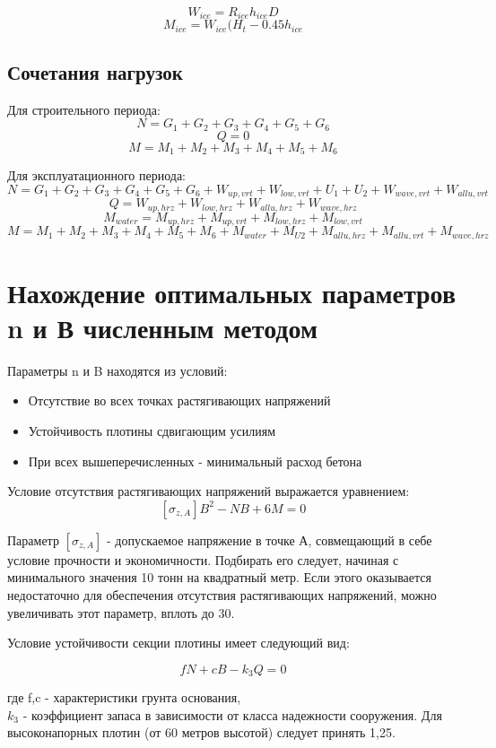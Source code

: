 \documentclass[12pt,a4paper,oneside,draft,titlepage]{article}
\begin{document}
$$ W_{ice} = R_{ice} h_{ice} D $$
$$ M_{ice} = W_{ice} (H_t - 0.45 h_{ice} $$

\subsection{Сочетания нагрузок}

Для строительного периода:
$$ N = G_1 + G_2 + G_3 + G_4 + G_5 + G_6 $$
$$ Q = 0 $$
$$ M = M_1 + M_2 + M_3 + M_4 + M_5 + M_6 $$

Для эксплуатационного периода:
$$ N = G_1 + G_2 + G_3 + G_4 + G_5 + G_6 + W_{up,vrt} + W_{low,vrt} + U_1 + U_2 + W_{wave,vrt} + W_{allu,vrt} $$
$$ Q = W_{up,hrz} + W_{low,hrz} + W_{allu,hrz} + W_{wave,hrz} $$
$$ M_{water} = M_{up,hrz} + M_{up,vrt} + M_{low,hrz} + M_{low,vrt} $$
$$ M = M_1 + M_2 + M_3 + M_4 + M_5 + M_6 + M_{water} + M_{U2} + M_{allu,hrz} + M_{allu,vrt} + M_{wave,hrz} $$

\section{Нахождение оптимальных параметров n и В численным методом}

Параметры n и B находятся из условий:
\begin{itemize}
	\item Отсутствие во всех точках растягивающих напряжений
	\item Устойчивость плотины сдвигающим усилиям
	\item При всех вышеперечисленных - минимальный расход бетона
\end{itemize}

Условие отсутствия растягивающих напряжений выражается уравнением:
$$ [\sigma_{z,A}]  B ^ 2 - N  B + 6  M = 0 $$

Параметр $[\sigma_{z,A}]$ - допускаемое напряжение в точке А, совмещающий в себе условие прочности и экономичности. Подбирать его следует, начиная с минимального значения 10 тонн на квадратный метр. Если этого оказывается недостаточно для обеспечения отсутствия растягивающих напряжений, можно увеличивать этот параметр, вплоть до 30.\newline

Условие устойчивости секции плотины имеет следующий вид:

$$ f  N + c  B - k_3  Q = 0 $$

где f,c - характеристики грунта основания,\\
$k_3$ - коэффициент запаса в зависимости от класса надежности сооружения. Для высоконапорных плотин (от 60 метров высотой) следует принять 1,25.
\end{document}
